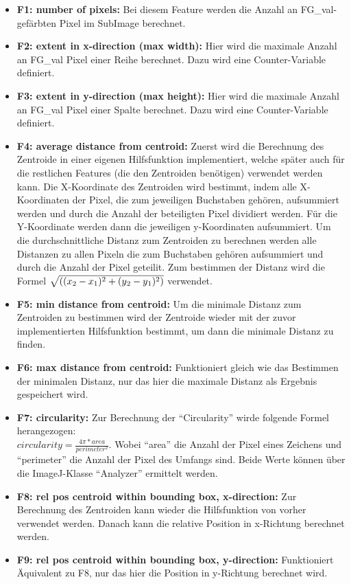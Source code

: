 \documentclass[11pt, a4paper, twoside]{article}   	%
\begin{document}
\begin{itemize}
	\item \textbf{F1: number of pixels: }
	Bei diesem Feature werden die Anzahl an FG\_val-gefärbten Pixel im SubImage berechnet.
	
	\item \textbf{F2: extent in x-direction (max width): } 
	Hier wird die maximale Anzahl an FG\_val Pixel einer Reihe berechnet. Dazu wird eine Counter-Variable definiert.
	
	\item \textbf{F3: extent in y-direction (max height): }
	Hier wird die maximale Anzahl an FG\_val Pixel einer Spalte berechnet. Dazu wird eine Counter-Variable definiert.
	
	\item \textbf{F4: average distance from centroid: } Zuerst wird die Berechnung des Zentroide in einer eigenen Hilfsfunktion implementiert, welche später auch für die restlichen Features (die den Zentroiden benötigen) verwendet werden kann. Die X-Koordinate des Zentroiden wird bestimmt, indem alle X-Koordinaten der Pixel, die zum jeweiligen Buchstaben gehören, aufsummiert werden und durch die Anzahl der beteiligten Pixel dividiert werden. Für die Y-Koordinate werden dann die jeweiligen y-Koordinaten aufsummiert. 
	Um die durchschnittliche Distanz zum Zentroiden zu berechnen werden alle Distanzen zu allen Pixeln die zum Buchstaben gehören aufsummiert und durch die Anzahl der Pixel geteilit. Zum bestimmen der Distanz wird die Formel $\sqrt{((x\textsubscript{2} - x\textsubscript{1})^2 + (y\textsubscript{2} - y\textsubscript{1})^2)}$ verwendet.
	
	\item \textbf{F5: min distance from centroid: } Um die minimale Distanz zum Zentroiden zu bestimmen wird der Zentroide wieder mit der zuvor implementierten Hilfsfunktion bestimmt, um dann die minimale Distanz zu finden.
	
	\item \textbf{F6: max distance from centroid: } Funktioniert gleich wie das Bestimmen der minimalen Distanz, nur das hier die maximale Distanz als Ergebnis gespeichert wird.
	
	\item \textbf{F7: circularity: } Zur Berechnung der \enquote{Circularity} wirde folgende Formel herangezogen:\\ $circularity = \frac{4\pi * area}{perimeter^2}$. Wobei \enquote{area} die Anzahl der Pixel eines Zeichens und \enquote{perimeter} die Anzahl der Pixel des Umfangs sind. Beide Werte können über die ImageJ-Klasse \enquote{Analyzer} ermittelt werden.
	
	\item \textbf{F8: rel pos centroid within bounding box, x-direction: } Zur Berechnung des Zentroiden kann wieder die Hilfsfunktion von vorher verwendet werden. Danach kann die relative Position in x-Richtung berechnet werden.
	
	\item \textbf{F9: rel pos centroid within bounding box, y-direction: } Funktioniert Äquivalent zu F8, nur das hier die Position in y-Richtung berechnet wird.
	
\end{itemize}
\end{document}
